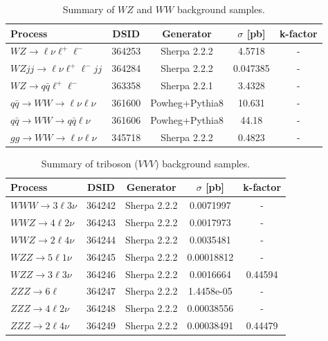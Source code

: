 \begin{table}[htbp]
\centering
\scriptsize
\begin{tabularx}{400pt}{|X||c|c|c|c|}
\hline
\centering \textbf{Process} & \textbf{DSID} & \textbf{Generator} & \textbf{$\sigma$ [pb]} & \textbf{k-factor}\\
\hline
\centering $WZ \to \ell\nu\ell^+\ell^-$ & 364253 & Sherpa 2.2.2 & 4.5718 & - \\ \hline
\centering $WZjj \to \ell\nu\ell^+\ell^-jj$ & 364284 & Sherpa 2.2.2 & 0.047385 & - \\ \hline
\centering $WZ \rightarrow q\bar{q}\ell^{+} \ell^{-}$ & 363358 & Sherpa 2.2.1 & 3.4328 & - \\ \hline
\centering $q\bar{q} \rightarrow WW \to \ell\nu\ell\nu$ & 361600 & Powheg+Pythia8 & 10.631 & - \\ \hline
\centering $q\bar{q}\rightarrow WW \rightarrow q\bar{q} \ell\nu $ & 361606 & Powheg+Pythia8 & 44.18 & - \\ \hline
\centering $gg \rightarrow WW \to \ell\nu\ell\nu$ & 345718 & Sherpa 2.2.2 & 0.4823 & - \\ \hline
\end{tabularx}
\caption{\rm Summary of $WZ$ and $WW$ background samples.}
\label{tab:WZandWWsamples}
\end{table}

\begin{table}[htbp]
\centering
\scriptsize
\begin{tabularx}{400pt}{|X||c|c|c|c|}
\hline
\centering \textbf{Process} & \textbf{DSID} & \textbf{Generator} & \textbf{$\sigma$ [pb]} & \textbf{k-factor}\\
\hline
\centering $WWW \to 3\ell3\nu$ & 364242 & Sherpa 2.2.2 & 0.0071997 & - \\ \hline
\centering $WWZ \to 4\ell2\nu$ & 364243 & Sherpa 2.2.2 & 0.0017973 & - \\ \hline 
\centering $WWZ \to 2\ell4\nu$ & 364244 & Sherpa 2.2.2 & 0.0035481 & - \\ \hline 
\centering $WZZ \to 5\ell1\nu$ & 364245 & Sherpa 2.2.2 & 0.00018812 & - \\ \hline 
\centering $WZZ \to 3\ell3\nu$ & 364246 & Sherpa 2.2.2 & 0.0016664 & 0.44594 \\ \hline 
\centering $ZZZ \to 6\ell$ & 364247 & Sherpa 2.2.2 & 1.4458e-05 & - \\ \hline 
\centering $ZZZ \to 4\ell2\nu$ & 364248 & Sherpa 2.2.2 & 0.00038556 & - \\ \hline
\centering $ZZZ \to 2\ell4\nu$ & 364249 & Sherpa 2.2.2 & 0.00038491 & 0.44479 \\ \hline 
\end{tabularx}
\caption{\rm Summary of triboson ($VVV$) background samples.}
\label{tab:VVVsamples}
\end{table}

